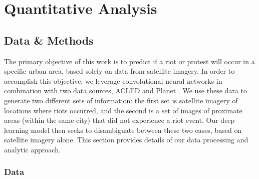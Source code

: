 
\chapter{Quantitative Analysis} \label{sec:chapter3} %


\label{Chapter3} %



\section{Data \& Methods}
The primary objective of this work is to predict if a riot or protest will occur in a specific urban area, based solely on data from satellite imagery.  In order to accomplish this objective, we leverage convolutional neural networks in combination with two data sources, ACLED \citep{ACLED} and Planet \citep{planet}. We use these data to generate two different sets of information: the first set is satellite imagery of locations where riots occurred, and the second is a set of images of proximate areas (within the same city) that did not experience a riot event.  Our deep learning model then seeks to disambiguate between these two cases, based on satellite imagery alone. This section provides details of our data processing and analytic approach.

\subsection{Data} \label{sec:data_paper1}
